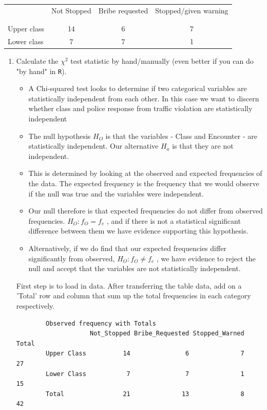 \documentclass[12pt,letterpaper]{article}
\begin{document}
\begin{table}[h!]
	\centering
	\begin{tabular}{l | c c c }
		& Not Stopped & Bribe requested & Stopped/given warning \\
		\\[-1.8ex] 
		\hline \\[-1.8ex]
		Upper class & 14 & 6 & 7 \\
		Lower class & 7 & 7 & 1 \\
		\hline
	\end{tabular}
\end{table}
\newpage
\begin{enumerate}
	
	\item [(a)]
	Calculate the $\chi^2$ test statistic by hand/manually (even better if you can do "by hand" in \texttt{R}).\\
	
	\begin{itemize}
		\item  A Chi-squared test looks to determine if two categorical variables are statistically independent from each other. In this case we want to discern whether class and police response from traffic violation are statistically independent
		\item The null hypothesis $H_O$ is that the variables - Class and Encounter - are statistically independent. Our alternative $H_a$ is that they are not independent. 
		\item This is determined by looking at the observed and expected frequencies of the data. The expected frequency is the frequency that we would observe if the null was true and the variables were independent. 
		\item Our null therefore is that expected frequencies do not differ from observed frequencies. $H_O: f_O = f_e$ , and if there is not a statistical significant difference between them we have evidence supporting this hypothesis.
		\item  Alternatively, if we do find that our expected frequencies differ significantly from observed, $H_O: f_O \ne f_e$ , we have evidence to reject the null and accept that the variables are not statistically independent.   
	\end{itemize} 
	\vspace{1cm}
	
	First step is to load in data. After transferring the table data, add on a 'Total' row and column that sum up the total frequencies in each category respectively. \\
	 
	\begin{verbatim}
		Observed frequency with Totals
		            Not_Stopped Bribe_Requested Stopped_Warned Total
		Upper Class          14               6              7    27
		Lower Class           7               7              1    15
		Total                21              13              8    42
	\end{verbatim}
	

\end{enumerate}
\end{document}
